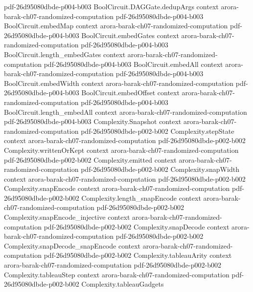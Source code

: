 \begin{theorem}
  {pdf-26d95080dbde-p004-b003}
\proofstep
  {BoolCircuit.DAGGate.dedupArgs}
  {context}
  {arora-barak-ch07-randomized-computation}
  {pdf-26d95080dbde-p004-b003}
\proofstep
  {BoolCircuit.embedMap}
  {context}
  {arora-barak-ch07-randomized-computation}
  {pdf-26d95080dbde-p004-b003}
\proofstep
  {BoolCircuit.embedGates}
  {context}
  {arora-barak-ch07-randomized-computation}
  {pdf-26d95080dbde-p004-b003}
\proofstep
  {BoolCircuit.length_embedGates}
  {context}
  {arora-barak-ch07-randomized-computation}
  {pdf-26d95080dbde-p004-b003}
\proofstep
  {BoolCircuit.embedAll}
  {context}
  {arora-barak-ch07-randomized-computation}
  {pdf-26d95080dbde-p004-b003}
\proofstep
  {BoolCircuit.embedWidth}
  {context}
  {arora-barak-ch07-randomized-computation}
  {pdf-26d95080dbde-p004-b003}
\proofstep
  {BoolCircuit.embedOffset}
  {context}
  {arora-barak-ch07-randomized-computation}
  {pdf-26d95080dbde-p004-b003}
\proofstep
  {BoolCircuit.length_embedAll}
  {context}
  {arora-barak-ch07-randomized-computation}
  {pdf-26d95080dbde-p004-b003}
\proofstep
  {Complexity.Snapshot}
  {context}
  {arora-barak-ch07-randomized-computation}
  {pdf-26d95080dbde-p002-b002}
\proofstep
  {Complexity.stepState}
  {context}
  {arora-barak-ch07-randomized-computation}
  {pdf-26d95080dbde-p002-b002}
\proofstep
  {Complexity.writtenOrKept}
  {context}
  {arora-barak-ch07-randomized-computation}
  {pdf-26d95080dbde-p002-b002}
\proofstep
  {Complexity.emitted}
  {context}
  {arora-barak-ch07-randomized-computation}
  {pdf-26d95080dbde-p002-b002}
\proofstep
  {Complexity.snapWidth}
  {context}
  {arora-barak-ch07-randomized-computation}
  {pdf-26d95080dbde-p002-b002}
\proofstep
  {Complexity.snapEncode}
  {context}
  {arora-barak-ch07-randomized-computation}
  {pdf-26d95080dbde-p002-b002}
\proofstep
  {Complexity.length_snapEncode}
  {context}
  {arora-barak-ch07-randomized-computation}
  {pdf-26d95080dbde-p002-b002}
\proofstep
  {Complexity.snapEncode_injective}
  {context}
  {arora-barak-ch07-randomized-computation}
  {pdf-26d95080dbde-p002-b002}
\proofstep
  {Complexity.snapDecode}
  {context}
  {arora-barak-ch07-randomized-computation}
  {pdf-26d95080dbde-p002-b002}
\proofstep
  {Complexity.snapDecode_snapEncode}
  {context}
  {arora-barak-ch07-randomized-computation}
  {pdf-26d95080dbde-p002-b002}
\proofstep
  {Complexity.tableauArity}
  {context}
  {arora-barak-ch07-randomized-computation}
  {pdf-26d95080dbde-p002-b002}
\proofstep
  {Complexity.tableauStep}
  {context}
  {arora-barak-ch07-randomized-computation}
  {pdf-26d95080dbde-p002-b002}
\proofstep
  {Complexity.tableauGadgets}

\end{theorem}
